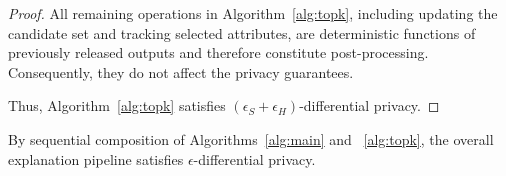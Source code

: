 \begin{proof}
All remaining operations in Algorithm~\ref{alg:topk}, including updating the candidate set and tracking selected attributes, are deterministic functions of previously released outputs and therefore constitute post-processing. Consequently, they do not affect the privacy guarantees.

Thus, Algorithm~\ref{alg:topk} satisfies $(\epsilon_S + \epsilon_H)$-differential privacy.
\end{proof}

\begin{corollary}
\label{cor:end-to-end-dp}
By sequential composition of Algorithms~\ref{alg:main} and ~\ref{alg:topk}, the overall explanation pipeline satisfies $\epsilon$-differential privacy.
\end{corollary}








